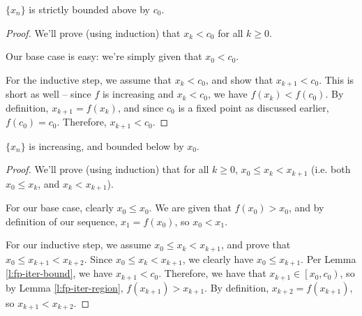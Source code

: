 

\begin{lemma}
\label{l:fp-iter-bound}
$\{x_n\}$ is strictly bounded above by $c_0$.
\end{lemma}
\begin{proof}
We'll prove (using induction) that $x_k < c_0$ for all $k \geq 0$. 

Our base case is easy: we're simply given that $x_0 < c_0$.

For the inductive step, we assume that $x_k < c_0$, and show that $x_{k+1} < c_0$. This is short as well -- since $f$ is increasing and $x_k < c_0$, we have $f(x_k) < f(c_0)$. By definition, $x_{k+1} = f(x_k)$, and since $c_0$ is a fixed point as discussed earlier, $f(c_0) = c_0$. Therefore, $x_{k+1} < c_0$. 
\end{proof}


\begin{lemma}
\label{l:fp-iter-increasing-lower-bound}
$\{x_n\}$ is increasing, and bounded below by $x_0$. 
\end{lemma}
\begin{proof}
We'll prove (using induction) that for all $k \geq 0$, $x_0 \leq x_k < x_{k+1}$ (i.e. both $x_0 \leq x_k$, and $x_k < x_{k+1}$). 

For our base case, clearly $x_0 \leq x_0$. We are given that $f(x_0) > x_0$, and by definition of our sequence, $x_1 = f(x_0)$, so $x_0 < x_1$.

For our inductive step, we assume $x_0 \leq x_k < x_{k+1}$, and prove that $x_0 \leq x_{k+1} < x_{k+2}$. Since $x_0 \leq x_k < x_{k+1}$, we clearly have $x_0 \leq x_{k+1}$. Per Lemma \ref{l:fp-iter-bound}, we have $x_{k+1} < c_0$. Therefore, we have that $x_{k+1} \in \left[x_0, c_0\right)$, so by Lemma \ref{l:fp-iter-region}, $f(x_{k+1}) > x_{k+1}$. By definition, $x_{k+2} = f(x_{k+1})$, so $x_{k+1} < x_{k+2}$. 

\end{proof}

